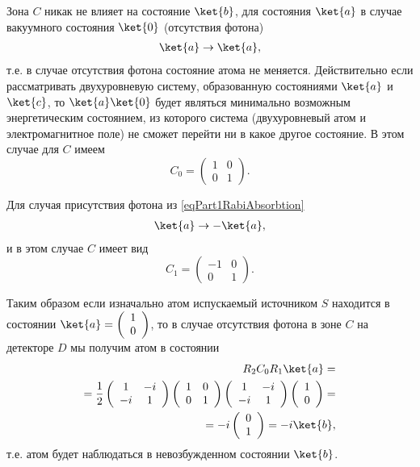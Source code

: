 Зона $C$ никак не влияет на состояние $\ket{b}$, для состояния
$\ket{a}$ в случае вакуумного состояния $\ket{0}$
(отсутствия фотона)
\begin{eqnarray}
  \ket{a} \rightarrow \ket{a},
  \nonumber
\end{eqnarray}
т.е. в случае отсутствия фотона состояние атома не
меняется. Действительно если рассматривать двухуровневую систему,
образованную состояниями $\ket{a}$ и $\ket{c}$, то
$\ket{a}\ket{0}$ будет являться минимально возможным
энергетическим состоянием, из которого система (двухуровневый атом и
электромагнитное поле) не сможет перейти ни в
какое другое состояние.
В этом случае для $C$ имеем
\[
C_0 = \left(
\begin{array} {cc}
1 & 0
\\
0 & 1 
\end{array}
\right).
\]

Для случая присутствия фотона из \eqref{eqPart1RabiAbsorbtion}
\begin{eqnarray}
  \ket{a} \rightarrow -\ket{a},
  \nonumber
\end{eqnarray}
и в этом случае $C$ имеет вид
\[
C_1 = \left(
\begin{array} {cc}
-1 & 0
\\
0 & 1 
\end{array}
\right).
\]

Таким образом если изначально атом испускаемый источником $S$
находится в состоянии $\ket{a} = \left(
\begin{array} {c}
1
\\
0
\end{array}
\right)$, то в случае отсутствия фотона в зоне $C$ на детекторе $D$ мы
получим атом в состоянии
\begin{eqnarray}
  R_2 C_0 R_1 \ket{a} =
  \nonumber \\
  =
  \frac{1}{2}
  \left(
  \begin{array} {cc}
    1 & -i
    \\
    -i & 1 
  \end{array}
  \right)
  \left(
  \begin{array} {cc}
    1 & 0
    \\
    0 & 1 
  \end{array}
  \right)
  \left(
  \begin{array} {cc}
    1 & -i
    \\
    -i & 1 
  \end{array}
  \right)
  \left(
  \begin{array} {c}
    1
    \\
    0
  \end{array}
  \right) =
  \nonumber \\
  =
  -i 
  \left(
  \begin{array} {c}
    0
    \\
    1
  \end{array}
  \right) =
  -i \ket{b},
  \nonumber
\end{eqnarray}
т.е. атом будет наблюдаться в невозбужденном состоянии
$\ket{b}$.

